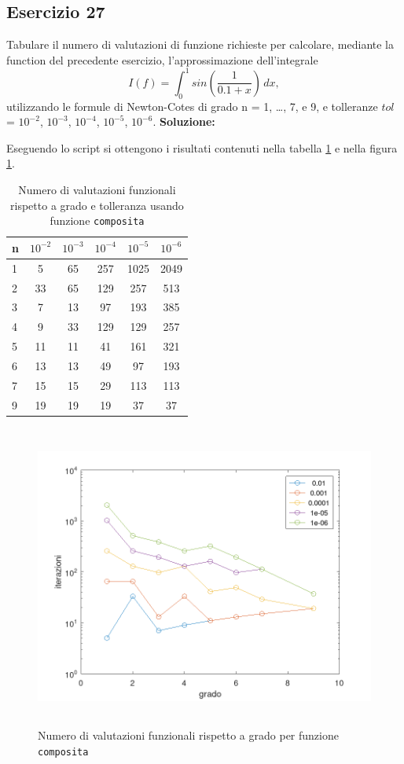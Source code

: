 \subsection{Esercizio 27}
Tabulare il numero di valutazioni di funzione richieste per calcolare, mediante la
function del precedente esercizio, l'approssimazione dell'integrale
\[
    I(f) = \int_{0}^{1} sin\left(\frac{1}{0.1+x}\right)\,dx,
\]
utilizzando le formule di Newton-Cotes di grado n = 1, \dots, 7, e 9,
e tolleranze $tol$ = $10^{-2}$, $10^{-3}$, $10^{-4}$, $10^{-5}$, $10^{-6}$.
\newline \textbf{Soluzione:}

Eseguendo lo script  si ottengono i risultati contenuti nella
tabella \ref{tab:27} e nella figura \ref{fig:es27}.
\begin{table}[ht]
    \centering
    \renewcommand\arraystretch{2}
    \begin{tabular}{| l | c c c c c |}
        \hline
        n & $10^{-2}$ & $10^{-3}$ & $10^{-4}$ & $10^{-5}$ & $10^{-6}$ \\
        \hline
        1 & 5         & 65        & 257       & 1025      & 2049      \\
        2 & 33        & 65        & 129       & 257       & 513       \\
        3 & 7         & 13        & 97        & 193       & 385       \\
        4 & 9         & 33        & 129       & 129       & 257       \\
        5 & 11        & 11        & 41        & 161       & 321       \\
        6 & 13        & 13        & 49        & 97        & 193       \\
        7 & 15        & 15        & 29        & 113       & 113       \\
        9 & 19        & 19        & 19        & 37        & 37        \\
        \hline
    \end{tabular}
    \caption{Numero di valutazioni funzionali rispetto a grado e tolleranza usando funzione \lstinline{composita}}
    \label{tab:27}
\end{table}
\FloatBarrier
\begin{figure}[!ht]
    \centering
    \includegraphics[width=16cm,height=10cm,keepaspectratio]{capitolo5/es27_figure.png}
    \caption{Numero di valutazioni funzionali rispetto a grado per funzione \lstinline{composita}}
    \label{fig:es27}
\end{figure}
\FloatBarrier
